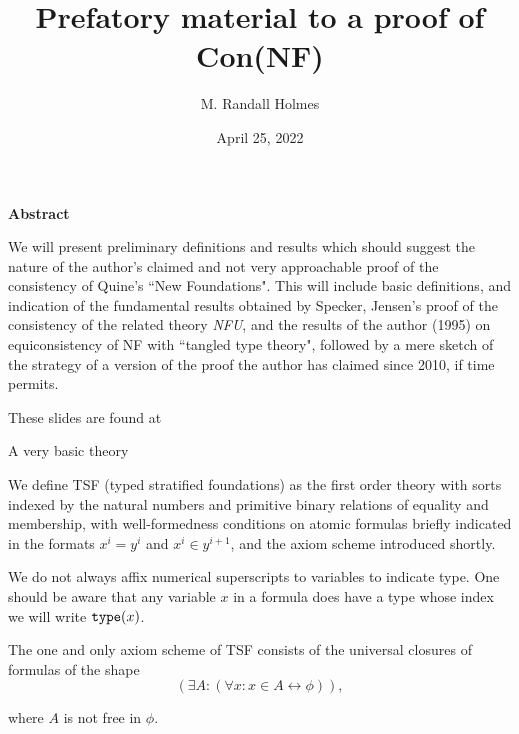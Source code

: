 \documentclass{slides}
\title{Prefatory material to a proof of Con(NF)}
\author{M. Randall Holmes}
\date{April 25, 2022}
\begin{document}
\begin{slide}

\maketitle

\begin{center}{\bf Abstract}\end{center}

We will present preliminary definitions and results which should suggest the nature of the author's claimed and not very approachable proof of the consistency of Quine's ``New Foundations".  This will include basic definitions, and indication of the fundamental results obtained by Specker, Jensen's proof of the consistency of the related theory {\em NFU\/}, and the results of the author (1995) on equiconsistency of NF with ``tangled type theory", followed by a mere sketch of the strategy of a version of the proof the author has claimed since 2010, if time permits.

These slides are found at 

\end{slide}

\begin{slide}

{\Large  A very basic theory}

We define TSF (typed stratified foundations) as the first order theory with sorts indexed by the natural numbers and primitive binary relations
of equality and membership, with well-formedness conditions on atomic formulas briefly indicated in the formats $x^i=y^i$ and $x^i \in y^{i+1}$, and the axiom scheme introduced shortly.

We do not always affix numerical superscripts to variables to indicate type.  One should be aware that any variable $x$ in a formula does have a type whose index we will write ${\tt type}(x)$.

The one and only axiom scheme of TSF consists of the universal closures of formulas of the shape $$(\exists A:(\forall x:x\in A \leftrightarrow \phi)),$$

where $A$ is not free in $\phi$.


\end{slide}
\end{document}
